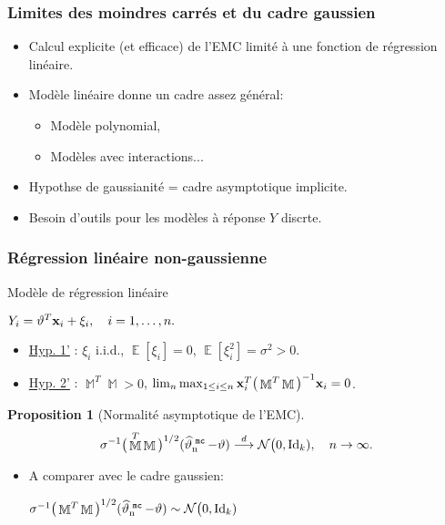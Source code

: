 \documentclass{beamer}
\newtheorem{prop}[theo]{Proposition}
\DeclareMathOperator{\E}{{\mathbb E}}
\DeclareMathOperator{\estMC}{\widehat \vartheta_n^{\,\,{\tt mc}}}
\DeclareMathOperator{\design}{\mathbb{M}}
\begin{document}
\begin{frame}
\frametitle{Limites des moindres carrés et du cadre gaussien}
\begin{itemize}
\item Calcul \alert{explicite} (et efficace) de l'EMC  limité à
une fonction de régression \alert{linéaire}.
\item Mod\`ele linéaire donne un cadre assez général:
\begin{itemize}
\item Mod\`ele
polynomial, \item \alert{Mod\`eles avec interactions...}
\end{itemize}
\item \alert{ Hypothse de gaussianité} = cadre asymptotique implicite.
\item Besoin d'outils pour les modèles  à réponse \alert{$Y$ discrte}.
\end{itemize}
\end{frame}


\begin{frame}
\frametitle{Régression linéaire non-gaussienne} Mod\`ele de
régression linéaire \vspace{3mm} \centerline{$ Y_i= \vartheta^T
{\bf x}_i+\xi_i, \quad i=1,\dots,n.$}

\vspace{-2mm}

\begin{itemize}
\item \underline{Hyp. 1'} : \alert{$\xi_i$ i.i.d., $\E[\xi_i]
=0$, $\E[\xi_i^2] = \sigma^2>0$.}
\item \underline{Hyp. 2'} : $\design^T \design>0$, \alert{$\lim_n\max_{1\le i \le n}{\bf x}_i^T
\big(\design^T \design\big)^{-1}{\bf x}_i =0$.}
\end{itemize}
\begin{prop}[Normalité asymptotique de l'EMC]
$$
\sigma^{-1}\big(\design^T
\design\big)^{1/2}(\estMC-\vartheta)\stackrel{d}{\longrightarrow}
{\mathcal N}\big(0, \mathrm{Id}_k), \quad n\to\infty.
$$
\end{prop}
\begin{itemize}
\item A comparer avec le cadre gaussien:\vspace{2mm}
\centerline{$\sigma^{-1}\big(\design^T
\design\big)^{1/2}(\estMC-\vartheta)\sim {\mathcal N}\big(0,
\mathrm{Id}_k)$ }
\end{itemize}
\end{frame}
\end{document}

